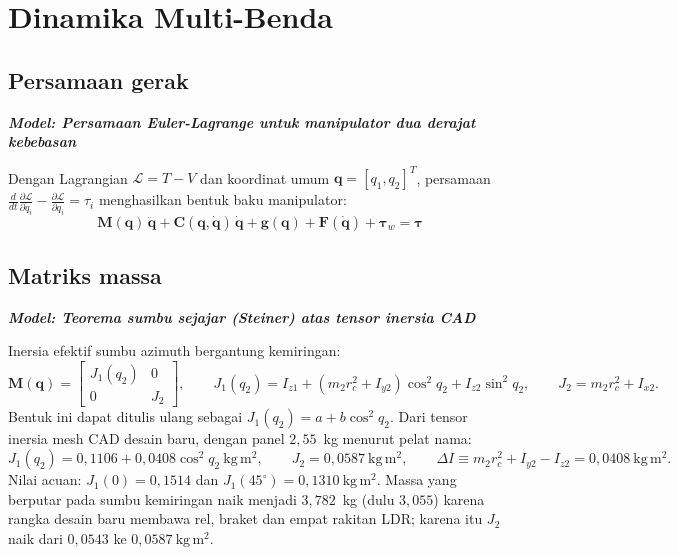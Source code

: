 \documentclass[11pt,a4paper]{article}
\newcommand{\degg}{^\circ}
\newcommand{\model}[1]{\textbf{\textit{Model: #1}}}
\begin{document}
\section{Dinamika Multi-Benda}

\subsection{Persamaan gerak}

\model{Persamaan Euler-Lagrange untuk manipulator dua derajat kebebasan}

Dengan Lagrangian $\mathcal{L} = T - V$ dan koordinat umum $\bm{q} = [q_1, q_2]^T$, persamaan
$\frac{d}{dt}\frac{\partial\mathcal{L}}{\partial\dot{q}_i} - \frac{\partial\mathcal{L}}{\partial q_i}
= \tau_i$ menghasilkan bentuk baku manipulator:
\begin{equation}
\boxed{\;
\bm{M}(\bm{q})\,\ddot{\bm{q}} + \bm{C}(\bm{q},\dot{\bm{q}})\,\dot{\bm{q}} + \bm{g}(\bm{q})
+ \bm{F}(\dot{\bm{q}}) + \bm{\tau}_w = \bm{\tau} \; }
\label{eq:manip}
\end{equation}

\subsection{Matriks massa}

\model{Teorema sumbu sejajar (Steiner) atas tensor inersia CAD}

Inersia efektif sumbu azimuth bergantung kemiringan:
\begin{equation}
\bm{M}(\bm{q}) =
\begin{bmatrix}
J_1(q_2) & 0 \\ 0 & J_2
\end{bmatrix},
\qquad
J_1(q_2) = I_{z1} + \left( m_2 r_c^2 + I_{y2} \right)\cos^2 q_2 + I_{z2}\sin^2 q_2 ,
\qquad
J_2 = m_2 r_c^2 + I_{x2}.
\end{equation}
Bentuk ini dapat ditulis ulang sebagai $J_1(q_2) = a + b\cos^2 q_2$. Dari tensor inersia mesh CAD desain
baru, dengan panel $2{,}55$~kg menurut pelat nama:
\begin{equation}
J_1(q_2) = 0{,}1106 + 0{,}0408\cos^2 q_2 \ \mathrm{kg\,m^2}, \qquad
J_2 = 0{,}0587 \ \mathrm{kg\,m^2}, \qquad
\Delta I \equiv m_2 r_c^2 + I_{y2} - I_{z2} = 0{,}0408 \ \mathrm{kg\,m^2}.
\end{equation}
Nilai acuan: $J_1(0) = 0{,}1514$ dan $J_1(45\degg) = 0{,}1310 \ \mathrm{kg\,m^2}$. Massa yang berputar pada
sumbu kemiringan naik menjadi $3{,}782$~kg (dulu $3{,}055$) karena rangka desain baru membawa rel, braket
dan empat rakitan LDR; karena itu $J_2$ naik dari $0{,}0543$ ke $0{,}0587 \ \mathrm{kg\,m^2}$.
\end{document}
